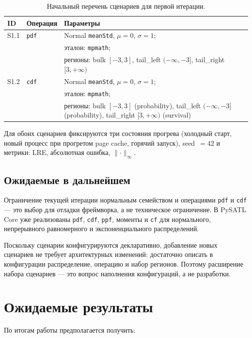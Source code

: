 \documentclass[12pt,a4paper]{article}
\begin{document}
\begin{table}[H]
\centering
\small
\begin{tabularx}{\textwidth}{@{}llX@{}}
\toprule
ID & Операция & Параметры \\
\midrule
S1.1 & \texttt{pdf} &
  Normal \texttt{meanStd}, $\mu = 0$, $\sigma = 1$; \\
     &             &
  эталон: \texttt{mpmath}; \\
     &             &
  регионы: bulk $[-3, 3]$, tail\_left $(-\infty, -3]$,
              tail\_right $[3, +\infty)$ \\
\midrule
S1.2 & \texttt{cdf} &
  Normal \texttt{meanStd}, $\mu = 0$, $\sigma = 1$; \\
     &             &
  эталон: \texttt{mpmath}; \\
     &             &
  регионы: bulk $[-3, 3]$ (probability),
              tail\_left $(-\infty, -3]$ (probability),
              tail\_right $[3, +\infty)$ (survival) \\
\bottomrule
\end{tabularx}
\caption{Начальный перечень сценариев для первой итерации.}
\label{tab:scenarios-iter1}
\end{table}

Для обоих сценариев фиксируются три состояния прогрева
(холодный старт, новый процесс при прогретом page cache,
горячий запуск), seed~$=42$ и метрики: LRE, абсолютная ошибка,
$\lVert\cdot\rVert_\infty$.

\subsection{Ожидаемые в дальнейшем}

Ограничение текущей итерации нормальным семейством и операциями
\texttt{pdf} и \texttt{cdf} --- это выбор для отладки фреймворка,
а не техническое ограничение. В PySATL Core уже реализованы
\texttt{pdf}, \texttt{cdf}, \texttt{ppf}, моменты и \texttt{cf}
для нормального, непрерывного равномерного и экспоненциального
распределений.

Поскольку сценарии конфигурируются декларативно, добавление
новых сценариев не требует архитектурных изменений: достаточно
описать в конфигурации распределение, операцию и набор регионов.
Поэтому расширение набора сценариев --- это вопрос наполнения
конфигураций, а не разработки.

\section{Ожидаемые результаты}
\label{sec:expected}
По итогам работы предполагается получить:
\end{document}
